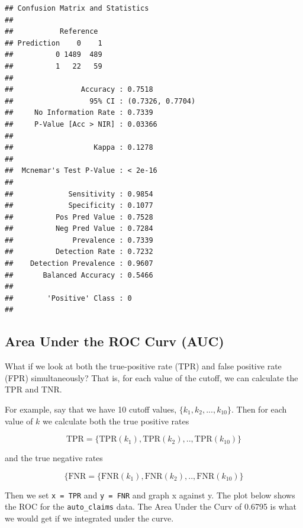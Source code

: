 \documentclass[openany]{book}
\newenvironment{Shaded}{\begin{snugshade}}{\end{snugshade}}
\newcommand{\DataTypeTok}[1]{\textcolor[rgb]{0.13,0.29,0.53}{#1}}
\newcommand{\KeywordTok}[1]{\textcolor[rgb]{0.13,0.29,0.53}{\textbf{#1}}}
\newcommand{\NormalTok}[1]{#1}
\newcommand{\OperatorTok}[1]{\textcolor[rgb]{0.81,0.36,0.00}{\textbf{#1}}}
\begin{document}
\begin{verbatim}
## Confusion Matrix and Statistics
## 
##           Reference
## Prediction    0    1
##          0 1489  489
##          1   22   59
##                                           
##                Accuracy : 0.7518          
##                  95% CI : (0.7326, 0.7704)
##     No Information Rate : 0.7339          
##     P-Value [Acc > NIR] : 0.03366         
##                                           
##                   Kappa : 0.1278          
##                                           
##  Mcnemar's Test P-Value : < 2e-16         
##                                           
##             Sensitivity : 0.9854          
##             Specificity : 0.1077          
##          Pos Pred Value : 0.7528          
##          Neg Pred Value : 0.7284          
##              Prevalence : 0.7339          
##          Detection Rate : 0.7232          
##    Detection Prevalence : 0.9607          
##       Balanced Accuracy : 0.5466          
##                                           
##        'Positive' Class : 0               
## 
\end{verbatim}

\hypertarget{area-under-the-roc-curv-auc}{%
\subsection{Area Under the ROC Curv (AUC)}\label{area-under-the-roc-curv-auc}}

What if we look at both the true-positive rate (TPR) and false positive rate (FPR) simultaneously? That is, for each value of the cutoff, we can calculate the TPR and TNR.

For example, say that we have 10 cutoff values, \(\{k_1, k_2, ..., k_{10}\}\). Then for each value of \(k\) we calculate both the true positive rates

\[\text{TPR} = \{\text{TPR}(k_1), \text{TPR}(k_2), .., \text{TPR}(k_{10})\} \]

and the true negative rates

\[\{\text{FNR} = \{\text{FNR}(k_1), \text{FNR}(k_2), .., \text{FNR}(k_{10})\}\]

Then we set \texttt{x\ =\ TPR} and \texttt{y\ =\ FNR} and graph x against y. The plot below shows the ROC for the \texttt{auto\_claims} data. The Area Under the Curv of 0.6795 is what we would get if we integrated under the curve.

\begin{Shaded}
\end{Shaded}
\end{document}
